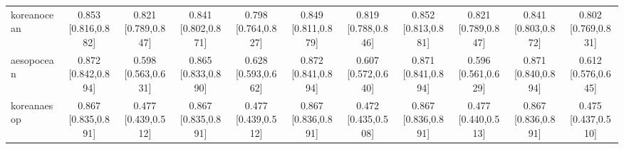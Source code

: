 \documentclass[10pt]{article}
\begin{document}
\begin{landscape}
\begin{longtable}{@{}l*{10}{c}@{}}
koreanocean & \shortstack{0.853\\{}[0.816,0.882]} & \shortstack{0.821\\{}[0.789,0.847]} & \shortstack{0.841\\{}[0.802,0.871]} & \shortstack{0.798\\{}[0.764,0.827]} & \shortstack{0.849\\{}[0.811,0.879]} & \shortstack{0.819\\{}[0.788,0.846]} & \shortstack{0.852\\{}[0.813,0.881]} & \shortstack{0.821\\{}[0.789,0.847]} & \shortstack{0.841\\{}[0.803,0.872]} & \shortstack{0.802\\{}[0.769,0.831]}\\
aesopocean & \shortstack{0.872\\{}[0.842,0.894]} & \shortstack{0.598\\{}[0.563,0.631]} & \shortstack{0.865\\{}[0.833,0.890]} & \shortstack{0.628\\{}[0.593,0.662]} & \shortstack{0.872\\{}[0.841,0.894]} & \shortstack{0.607\\{}[0.572,0.640]} & \shortstack{0.871\\{}[0.841,0.894]} & \shortstack{0.596\\{}[0.561,0.629]} & \shortstack{0.871\\{}[0.840,0.894]} & \shortstack{0.612\\{}[0.576,0.645]}\\
koreanaesop & \shortstack{0.867\\{}[0.835,0.891]} & \shortstack{0.477\\{}[0.439,0.512]} & \shortstack{0.867\\{}[0.835,0.891]} & \shortstack{0.477\\{}[0.439,0.512]} & \shortstack{0.867\\{}[0.836,0.891]} & \shortstack{0.472\\{}[0.435,0.508]} & \shortstack{0.867\\{}[0.836,0.891]} & \shortstack{0.477\\{}[0.440,0.513]} & \shortstack{0.867\\{}[0.836,0.891]} & \shortstack{0.475\\{}[0.437,0.510]}\\

\end{longtable}
\end{landscape}
\end{document}
